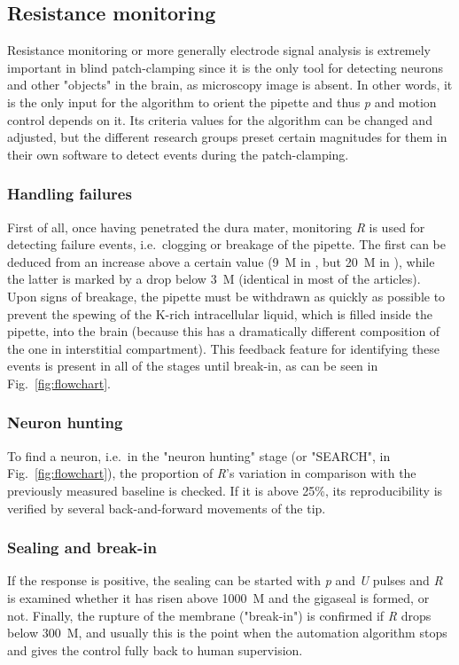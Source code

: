\documentclass[12pt,a4paper]{report}
\begin{document}
\subsection{Resistance monitoring}
Resistance monitoring or more generally electrode signal analysis is extremely important in blind patch-clamping since it is the only tool for detecting neurons and other "objects" in the brain, as microscopy image is absent. In other words, it is the only input for the algorithm to orient the pipette and thus \textit{p} and motion control depends on it. Its criteria values for the algorithm can be changed and adjusted, but the different research groups preset certain magnitudes for them in their own software to detect events during the patch-clamping.\par

\subsubsection{Handling failures}
First of all, once having penetrated the dura mater, monitoring \textit{R} is used for detecting failure events, i.e.\ clogging or breakage of the pipette. The first can be deduced from an increase above a certain value (9~M\textOmega{} in \cite{desai2015}, but 20~M\textOmega{} in \cite{li2017}), while the latter is marked by a drop below 3~M\textOmega{} (identical in most of the articles). Upon signs of breakage, the pipette must be withdrawn as quickly as possible to prevent the spewing of the K-rich intracellular liquid, which is filled inside the pipette, into the brain (because this has a dramatically different composition of the one in interstitial compartment). This feedback feature for identifying these events is present in all of the stages until break-in, as can be seen in Fig.~\ref{fig:flowchart}.

\subsubsection{Neuron hunting}
To find a neuron, i.e.\ in the "neuron hunting" stage (or "SEARCH", in Fig.~\ref{fig:flowchart}), the proportion of \textit{R}'s variation in comparison with the previously measured baseline is checked. If it is above 25\%, its reproducibility is verified by several back-and-forward movements of the tip.

\subsubsection{Sealing and break-in}
If the response is positive, the sealing can be started with \textit{p} and \textit{U} pulses and \textit{R} is examined whether it has risen above 1000~M\textOmega{} and the gigaseal is formed, or not. Finally, the rupture of the membrane ("break-in") is confirmed if \textit{R} drops below 300~M\textOmega, and usually this is the point when the automation algorithm stops and gives the control fully back to human supervision.
\end{document}
